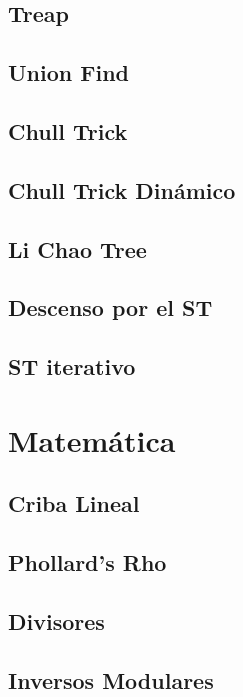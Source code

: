 \documentclass[a4paper,10pt,landscape,twocolumn]{article}
\begin{document}
\subsection{Treap}

\subsection{Union Find}

\subsection{Chull Trick}

\subsection{Chull Trick Dinámico}

\subsection{Li Chao Tree}

\subsection{Descenso por el ST}

\subsection{ST iterativo}


\section{Matemática} %
\subsection{Criba Lineal}

\subsection{Phollard's Rho}

\subsection{Divisores}

\subsection{Inversos Modulares}


\end{document}
